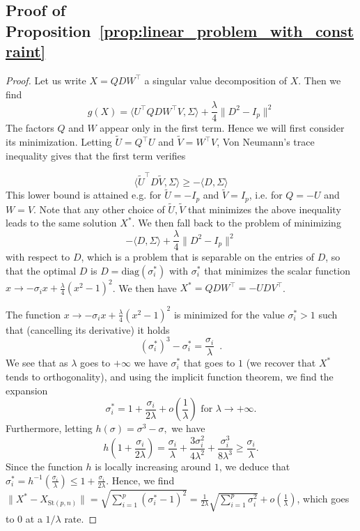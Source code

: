 \documentclass[twoside,11pt]{article}
\newcommand{\stiefel}{{\mathrm{St}(p, n)}}
\begin{document}
\subsection{Proof of Proposition~\ref{prop:linear_problem_with_constraint}}
\begin{proof}
    Let us write $X = QDW^\top$ a singular value decomposition of $X$. Then we find 
    $$g(X) = \langle U^\top QDW^{\top}V, \Sigma\rangle + \frac{\lambda}4\|D^2 - I_p\|^2$$
    The factors $Q$ and $W$ appear only in the first term. Hence we will first consider its minimization. 
    Letting $\tilde{U} = Q^{\top}U$ and $\tilde{V} =W^{\top}V$, Von Neumann's trace inequality gives that the first term verifies

    $$
    \langle \tilde{U}^{\top}D\tilde{V}, \Sigma\rangle \geq -\langle D, \Sigma\rangle
    $$
    This lower bound is attained e.g. for $\tilde{U} = - I_p$ and $\tilde{V}=I_p$, i.e. for $Q = -U$ and $W = V$. Note that any other choice of $\tilde{U}, \tilde{V}$ that minimizes the above inequality leads to the same solution $X^*$.
    We then fall back to the problem of minimizing
    $$
     -\langle D, \Sigma\rangle + \frac{\lambda}4\|D^2 - I_p\|^2
    $$
    with respect to $D$, which is a problem that is separable on the entries of $D$, so that the optimal $D$ is $D = \mathrm{diag}(\sigma_i^*)$ with $\sigma_i^*$ that minimizes the scalar function $x\to -\sigma_i x + \frac\lambda4(x^2 - 1)^2$. We then have $X^* = QDW^{\top} = -U DV^{\top}$.

    The function $x\to -\sigma_i x + \frac\lambda4(x^2 - 1)^2$ is minimized for the value $\sigma_i^*> 1$ such that (cancelling its derivative) it holds 
    $$
    (\sigma_i^*)^3 - \sigma_i^* = \frac{\sigma_i}{\lambda}\enspace.
    $$
    We see that as $\lambda$ goes to $+\infty$ we have $\sigma_i^*$ that goes to $1$ (we recover that $X^*$ tends to orthogonality), and using the implicit function theorem, we find the expansion
    $$
    \sigma_i^* = 1 + \frac{\sigma_i}{2\lambda} +o(\frac1\lambda) \text{ for }\lambda\to+\infty.
    $$
    Furthermore, letting $h(\sigma) = \sigma^3 - \sigma,$ we have 
    $$h(1 + \frac{\sigma_i}{2\lambda}) = \frac{\sigma_i}\lambda + \frac{3\sigma_i^2}{4\lambda^2} +  \frac{\sigma_i^3}{8\lambda^3} \geq \frac{\sigma_i}\lambda.$$
    Since the function $h$ is locally increasing around $1$, we deduce that  $\sigma_i^*  = h^{-1}(\frac{\sigma_i}\lambda) \leq 1 + \frac{\sigma_i}{2\lambda}$.
    Hence, we find $\|X^* - X_{\stiefel}\| = \sqrt{\sum_{i=1}^p(\sigma^*_i - 1)^2} = \frac1{2\lambda}\sqrt{\sum_{i=1}^p\sigma_i^2} + o(\frac{1}{\lambda})$, which goes to $0$ at a $1/\lambda$ rate.


\end{proof}
\end{document}
